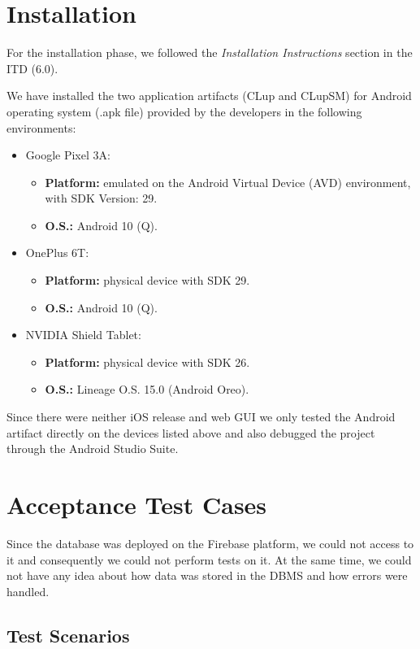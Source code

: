 \documentclass[table, 12pt]{article}
\begin{document}
\section{Installation}
For the installation phase, we followed the \textit{Installation Instructions} section in the ITD (6.0).

We have installed the two application artifacts (CLup and CLupSM) for Android operating system (.apk file) provided by the developers in the following environments:
\begin{itemize}
    \item Google Pixel 3A:
          \begin{itemize}
              \item \textbf{Platform:} emulated on the Android Virtual Device (AVD) environment, with SDK Version: 29.
              \item \textbf{O.S.:} Android 10 (Q).
          \end{itemize}
    \item OnePlus 6T:
          \begin{itemize}
              \item \textbf{Platform:} physical device with SDK 29.
              \item \textbf{O.S.:} Android 10 (Q).
          \end{itemize}
    \item NVIDIA Shield Tablet:
          \begin{itemize}
              \item \textbf{Platform:} physical device with SDK 26.
              \item \textbf{O.S.:} Lineage O.S. 15.0 (Android Oreo).
          \end{itemize}
\end{itemize}

Since there were neither iOS release and web GUI we only tested the Android artifact directly on the devices listed above and also debugged the project through the Android Studio Suite.
\newpage
\section{Acceptance Test Cases}
Since the database was deployed on the Firebase platform, we could not access to it and consequently we could not perform tests on it. At the same time, we could not have any idea about how data was stored in the DBMS and how errors were handled.

\subsection{Test Scenarios}
\end{document}
